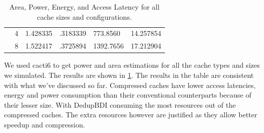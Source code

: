 \begin{table}[]
{\begin{tabular}{llllll}
    \multicolumn{1}{c|}{}                          & \multicolumn{1}{l|}{4}   & 1.428335                                                                          & .3183339                                                                               & 773.8560                                                                         & 14.257854                      \\
    \multicolumn{1}{c|}{}                          & \multicolumn{1}{l|}{8}   & 1.522417                                                                          & .3725894                                                                               & 1392.7656                                                                        & 17.212904                      \\ \cline{1-2}
    \end{tabular}%
    }
    \caption{Area, Power, Energy, and Access Latency for all cache sizes and configurations.}
    \label{tab:areapower}
\end{table}
We used cacti6\cite{cacti} to get power and area estimations for all the cache types and sizes we simulated. The results are shown in \ref{tab:areapower}. The results in the table are consistent with what we've discussed so far. Compressed caches have lower access latencies, energy and power consumption than their conventional counterparts because of their lesser size. With DedupBDI consuming the most resources out of the compressed caches. The extra resources however are justified as they allow better speedup and compression.